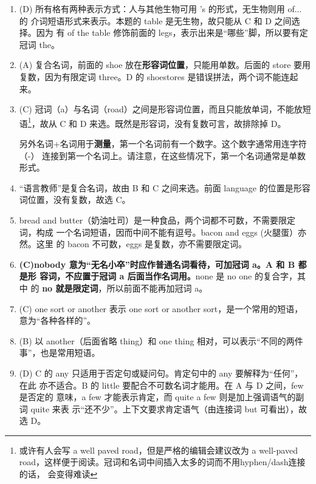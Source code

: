 \begin{enumerate}


\item (D) 所有格有两种表示方式：人与其他生物可用 's 的形式，无生物则用 of... 的
  介词短语形式来表示。本题的 table 是无生物，故只能从 C 和 D 之间选择。因为
  有 of the table 修饰前面的 legs，表示出来是“哪些”脚，所以要有定冠词 the。

\item (A) 复合名词，前面的 shoe 放在\textbf{形容词位置}，只能用单数。后面的 store 要用
  复数，因为有限定词 three。D 的 shoestores 是错误拼法，两个词不能连起来。

\item (C) 冠词（a）与名词（road）之间是形容词位置，而且只能放单词，不能放短
  语\footnote{或许有人会写 a well paved road，但是严格的编辑会建议改为 a well-paved
    road，这样便于阅读。冠词和名词中间插入太多的词而不用hyphen/dash连接的话，
    会变得难读}，故从 C 和 D 来选。既然是形容词，没有复数可言，故排除掉 D。

  另外名词+名词用于\textbf{测量}，第一个名词前有一个数字。这个数字通常用连字符（-）
  连接到第一个名词上。请注意，在这些情况下，第一个名词通常是单数形式。

\item “语言教师”是复合名词，故由 B 和
  C 之间来选。前面 language 的位置是形容词位置，没有复数，故选 C。

\item bread and butter（奶油吐司）是一种食品，两个词都不可数，不需要限定词，构成
  一个名词短语，因而中间不能有逗号。bacon and eggs (火腿蛋）亦然。这里
  的 bacon 不可数，eggs 是复数，亦不需要限定词。

\item \textbf{(C)nobody 意为“无名小卒”时应作普通名词看待，可加冠词 a。A 和 B 都是形
    容词，不应置于冠词 a 后面当作名词用。}none 是 no one 的复合字，其中
  的 \textbf{no 就是限定词}，所以前面不能再加冠词 a。

\item (C) one sort or another 表示 one sort or another sort，是一个常用的短语，
  意为“各种各样的”。

\item (B) 以 another（后面省略 thing）和 one thing 相对，可以表示“不同的两件
  事”，也是常用短语。

\item (D) C 的 any 只适用于否定句或疑问句。肯定句中的 any 要解释为“任何”，在此
  亦不适合。B 的 little 要配合不可数名词才能用。在 A 与 D 之间，few 是否定的
  意味，a few 才能表示肯定，而 quite a few 则是加上强调语气的副词 quite 来表
  示“还不少”。上下文要求肯定语气（由连接词 but 可看出），故选 D。


\end{enumerate}
